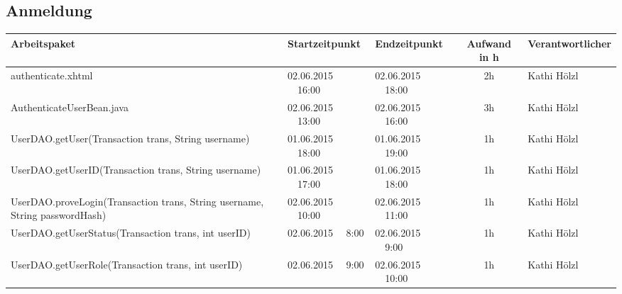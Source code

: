 \begin{landscape}
\subsection{Anmeldung}
\begin{tabular}{|p{10.3cm}|p{3.2cm}|p{3.2cm}|c|p{3.5cm}|}
	\hline  \textbf{Arbeitspaket} & \textbf{Startzeitpunkt} & \textbf{Endzeitpunkt} & \textbf{Aufwand in h} & \textbf{Verantwortlicher} \\ 
	\hline   authenticate.xhtml                                   & 02.06.2015 \ \ 16:00     & 02.06.2015 \ \ 18:00     &      2h               & Kathi Hölzl\\
	\hline   AuthenticateUserBean.java                            & 02.06.2015 \ \ 13:00     & 02.06.2015 \ \ 16:00     &      3h               & Kathi Hölzl\\
	\hline   UserDAO.getUser(Transaction trans, String username)  & 01.06.2015 \ \ 18:00     & 01.06.2015 \ \ 19:00     &      1h               & Kathi Hölzl\\
	\hline   UserDAO.getUserID(Transaction trans, String username)& 01.06.2015 \ \ 17:00     & 01.06.2015 \ \ 18:00     &      1h               & Kathi Hölzl\\
	\hline   UserDAO.proveLogin(Transaction trans, String username, String passwordHash)& 02.06.2015 \ \ 10:00     & 02.06.2015 \ \ 11:00     &      1h               & Kathi Hölzl\\
	\hline   UserDAO.getUserStatus(Transaction trans, int userID)         & 02.06.2015 \ \ 8:00     & 02.06.2015 \ \ 9:00     &      1h               & Kathi Hölzl\\
	\hline   UserDAO.getUserRole(Transaction trans, int userID)           & 02.06.2015 \ \ 9:00     & 02.06.2015 \ \ 10:00     &      1h               & Kathi Hölzl\\
	\hline 
\end{tabular} \ \\
\ \\


\end{landscape}
